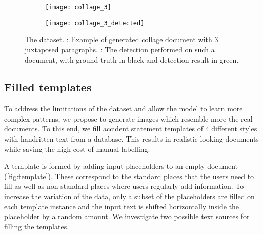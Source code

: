 		\begin{figure}
			\begin{subfigure}[c]{\textwidth}
				\texttt{[image: collage\_3]}
				\caption{}
				\label{sfig:collage_clean}
			\end{subfigure}
			\vspace{1em}

			\begin{subfigure}[c]{\textwidth}
				\texttt{[image: collage\_3\_detected]}
				\caption{}
				\label{sfig:collage_detect}
			\end{subfigure}
			\caption[ dataset]{
				The  dataset.
				: Example of generated collage document with 3 juxtaposed paragraphs.
				: The detection performed on such a document, with ground truth in black and detection result in green.
			}
			\label{fig:collage}
		\end{figure}


	\subsection{Filled templates}

			To address the limitations of the  dataset and allow the model to learn more complex patterns, we propose to generate images which resemble more the real documents. To this end, we fill accident statement templates of 4 different styles with handritten text from a database. This results in realistic looking documents while saving the high cost of manual labelling.

			A template is formed by adding input placeholders to an empty document (\autoref{fig:template}). These correspond to the standard places that the users need to fill as well as non-standard places where users regularly add information. To increase the variation of the data, only a subset of the placeholders are filled on each template instance and the input text is shifted horizontally inside the placeholder by a random amount. We investigate two possible text sources for filling the templates.

